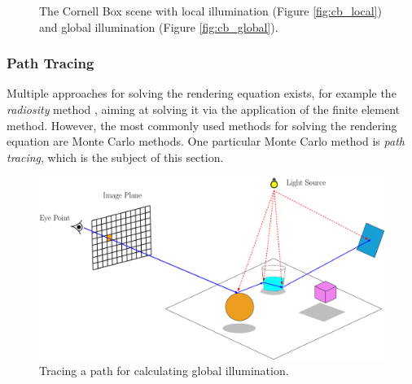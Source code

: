 \begin{figure}
	\centering
	\hfill
	\caption{The Cornell Box scene with local illumination (Figure \ref{fig:cb_local}) and global illumination (Figure \ref{fig:cb_global}).}
\end{figure}



\subsubsection{Path Tracing}

Multiple approaches for solving the rendering equation exists, for example the \emph{radiosity} method \cite{goral1984modeling}, aiming at solving it via the application of the finite element method. However, the most commonly used methods for solving the rendering equation are Monte Carlo methods. One particular Monte Carlo method is \emph{path tracing}, which is the subject of this section.

\begin{figure}
	\centering
	\includegraphics[width=1\linewidth]{img/1 fundamentals/path_tracing.png}
	\caption{Tracing a path for calculating global illumination.}
	\label{fig:pathtracing}
\end{figure}

